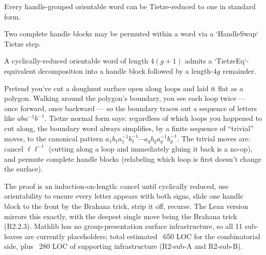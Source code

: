 \begin{lemma}
\label{lem:tietze-orientable-is-handle-concat}
Every handle-grouped orientable word can be Tietze-reduced to one in standard form.
\leanok
\end{lemma}

\begin{lemma}
\label{lem:tietze-handle-swap}
Two complete handle blocks may be permuted within a word via a `HandleSwap` Tietze step.
\leanok
\end{lemma}

\begin{lemma}
\label{lem:tietze-strip-one-handle}
A cyclically-reduced orientable word of length $4(g+1)$ admits a `TietzeEq`-equivalent decomposition into a handle block followed by a length-$4g$ remainder.
\leanok
\end{lemma}

\begin{layman}
Pretend you've cut a doughnut surface open along loops and laid it
flat as a polygon.  Walking around the polygon's boundary, you see
each loop twice --- once forward, once backward --- so the boundary
traces out a sequence of letters like \(a b a^{-1} b^{-1}\).  Tietze
normal form says: regardless of which loops you happened to cut
along, the boundary word always simplifies, by a finite sequence of
``trivial'' moves, to the canonical pattern
\(a_1 b_1 a_1^{-1} b_1^{-1} \cdots a_g b_g a_g^{-1} b_g^{-1}\).  The
trivial moves are: cancel \(\ell \ell^{-1}\) (cutting along a loop
and immediately gluing it back is a no-op), and permute complete
handle blocks (relabeling which loop is first doesn't change the
surface).

The proof is an induction-on-length: cancel until cyclically reduced,
use orientability to ensure every letter appears with both signs,
slide one handle block to the front by the Brahana trick, strip it
off, recurse.  The Lean version mirrors this exactly, with the
deepest single move being the Brahana trick (R2.2.3).  Mathlib
has no group-presentation surface infrastructure, so all 11 sub-leaves
are currently placeholders; total estimated ~650 LOC for the
combinatorial side, plus ~280 LOC of supporting infrastructure
(R2-sub-A and R2-sub-B).
\end{layman}

